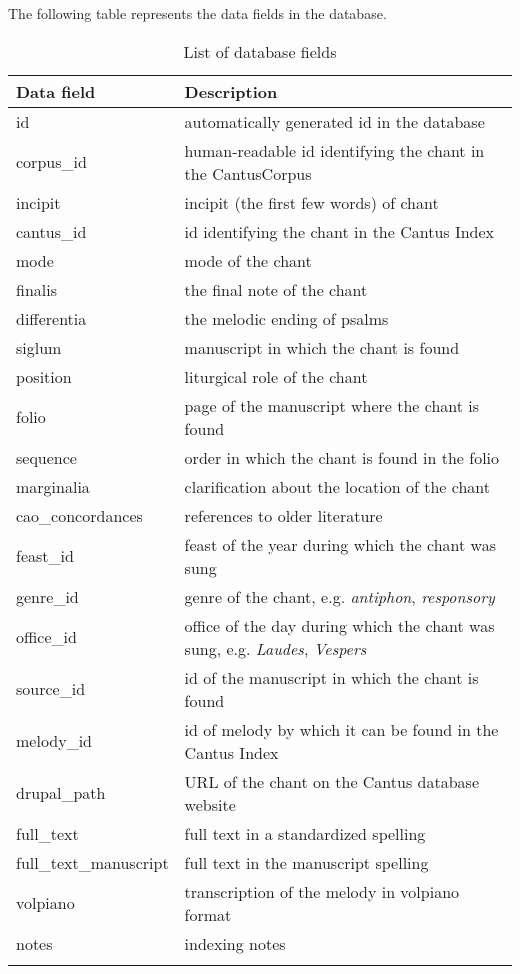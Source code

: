 The following table represents the data fields in the database.

\begin{longtable}{| p{} | p{} |} 

 \hline
 Data field & Description \\
 \hline
 id             & automatically generated id in the database \\ \hline
 corpus\_id     & human-readable id identifying the chant in the CantusCorpus \\ \hline
 incipit        & incipit (the first few words) of chant \\ \hline
 cantus\_id     & id identifying the chant in the Cantus Index \\ \hline
 mode           & mode of the chant \\ \hline
 finalis        & the final note of the chant \\ \hline
 differentia    & the melodic ending of psalms \\ \hline
 siglum         & manuscript in which the chant is found \\ \hline
 position       & liturgical role of the chant \\ \hline
 folio          & page of the manuscript where the chant is found \\ \hline
 sequence       & order in which the chant is found in the folio \\ \hline
 marginalia     & clarification about the location of the chant \\ \hline
 cao\_concordances & references to older literature \\ \hline
 feast\_id      & feast of the year during which the chant was sung \\ \hline
 genre\_id      & genre of the chant, e.g. \emph{antiphon}, \emph{responsory} \\ \hline
 office\_id     & office of the day during which the chant was sung, e.g. \emph{Laudes}, \emph{Vespers} \\ \hline
 source\_id     & id of the manuscript in which the chant is found \\ \hline
 melody\_id     & id of melody by which it can be found in the Cantus Index \\ \hline
 drupal\_path   & URL of the chant on the Cantus database website \\ \hline
 full\_text     & full text in a standardized spelling \\ \hline
 full\_text\_manuscript & full text in the manuscript spelling \\ \hline
 volpiano       & transcription of the melody in volpiano format \\ \hline
 notes          & indexing notes \\
 \hline

\caption{List of database fields}
\end{longtable}

